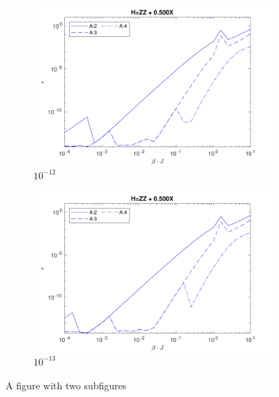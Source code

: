 \begin{figure} \ContinuedFloat
    \centering
    \begin{subfigure}{\textwidth}
        \centering
        \includegraphics[width=0.8\linewidth]{Figuren/mpo_construction/sigm0/e12.pdf}
        \caption{ ${10}^{-12}$}
        \label{fig:sub1}
    \end{subfigure}%

    \begin{subfigure}{\textwidth}
        \centering
        \includegraphics[width=0.8\linewidth]{Figuren/mpo_construction/sigm0/e13.pdf}
        \caption{${10}^{-13}$}
        \label{fig:sub2}
    \end{subfigure}
    \caption{A figure with two subfigures}
    \label{fig:sigman0}
\end{figure}


